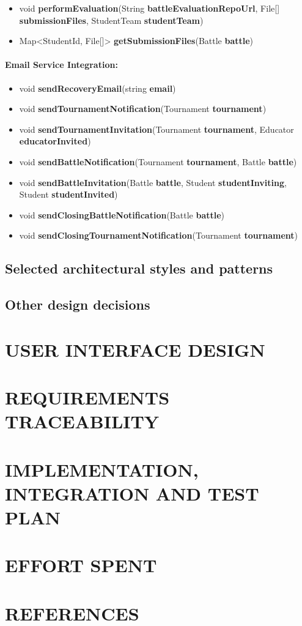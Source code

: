 \documentclass{article}
\begin{document}
\begin{itemize}
    \item void \textbf{performEvaluation}(String \textbf{battleEvaluationRepoUrl}, File[] \textbf{submissionFiles}, StudentTeam \textbf{studentTeam})
    \item Map<StudentId, File[]> \textbf{getSubmissionFiles}(Battle \textbf{battle})
\end{itemize}

\paragraph{Email Service Integration:}

\begin{itemize}
    \item void \textbf{sendRecoveryEmail}(string \textbf{email})
    \item void \textbf{sendTournamentNotification}(Tournament \textbf{tournament})
    \item void \textbf{sendTournamentInvitation}(Tournament \textbf{tournament}, Educator \textbf{educatorInvited})
    \item void \textbf{sendBattleNotification}(Tournament \textbf{tournament}, Battle \textbf{battle})
    \item void \textbf{sendBattleInvitation}(Battle \textbf{battle}, Student \textbf{studentInviting}, Student \textbf{studentInvited})
    \item void \textbf{sendClosingBattleNotification}(Battle \textbf{battle})
    \item void \textbf{sendClosingTournamentNotification}(Tournament \textbf{tournament})
\end{itemize}

\subsection{Selected architectural styles and patterns}



\subsection{Other design decisions}

\section{USER INTERFACE DESIGN}

\section{REQUIREMENTS TRACEABILITY}

\section{IMPLEMENTATION, INTEGRATION AND TEST PLAN}

\section{EFFORT SPENT}

\section{REFERENCES}
\end{document}
